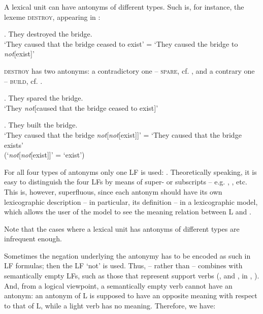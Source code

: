 A lexical unit can have antonyms of different types. Such is, for instance, the lexeme \textsc{destroy}, appearing in \Next: 

\begingroup
\small

\ex. They destroyed the bridge. \\
     `They caused that the bridge ceased to exist' = `They caused the bridge to \emph{not}[exist]'

\endgroup

\textsc{destroy} has two antonyms: a contradictory one -- \textsc{spare}, cf. \Next, and a contrary one -- \textsc{build}, cf. \NNext.

\begingroup
\small

\ex. They spared the bridge. \\
         `They \emph{not}[caused that the bridge ceased to exist]'
         
\ex. They built the bridge. \\
         `They caused that the bridge \emph{not}[\emph{not}[exist]]' = `They caused that the bridge exists' \\
         \hphantom{......................................................................................}(`\emph{not}[\emph{not}[exist]]' = `exist')

\endgroup

For all four types of antonyms only one LF is used: . Theoretically speaking, it is easy to distinguish the four  LFs by means of super- or subscripts -- e.g. , , etc. This is, however, superfluous, since each antonym should have its own lexicographic description -- in particular, its definition -- in a lexicographic model, which allows the user of the model to see the meaning relation between L and .

Note that the cases where a lexical unit has antonyms of different types are infrequent enough.

\largerpage
Sometimes the negation underlying the antonymy has to be encoded  as such in LF formulas; then the LF  `not' is used. Thus,  -- rather than  -- combines with semantically empty LFs, such as those that represent support verbs (,  and , in , ). And, from a logical viewpoint, a semantically empty verb cannot have an antonym: an antonym of L is supposed to have an opposite meaning with respect to that of L, while a light verb has no meaning. Therefore, we have:

